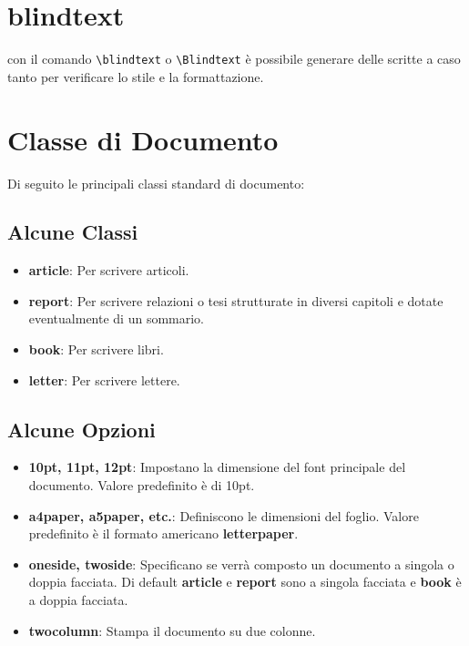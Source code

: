 \documentclass{article}
\begin{document}
        \section{blindtext}
            con il comando \verb!\blindtext! o \verb!\Blindtext! è possibile generare delle scritte a caso tanto per verificare lo stile e la formattazione.

        \section{Classe di Documento}
            Di seguito le principali classi standard di documento:
            \subsection{Alcune Classi}
                \begin{itemize}
                    \item \textbf{article}: Per scrivere articoli.
                    \item \textbf{report}: Per scrivere relazioni o tesi strutturate in diversi capitoli e dotate eventualmente di un sommario.
                    \item \textbf{book}: Per scrivere libri.
                    \item \textbf{letter}: Per scrivere lettere. 
                \end{itemize}

            \subsection{Alcune Opzioni}
                \begin{itemize}
                    \item \textbf{10pt, 11pt, 12pt}: Impostano la dimensione del font principale del documento. Valore predefinito è di 10pt.
                    \item \textbf{a4paper, a5paper, etc.}: Definiscono le dimensioni del foglio. Valore predefinito è il formato americano \textbf{letterpaper}.
                    \item \textbf{oneside, twoside}: Specificano se verrà composto un documento a singola o doppia facciata. Di default \textbf{article} e \textbf{report} sono a singola facciata e \textbf{book} è a doppia facciata.
                    \item \textbf{twocolumn}: Stampa il documento su due colonne.
                \end{itemize}
\end{document}
